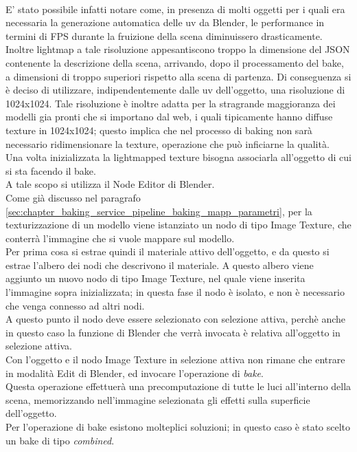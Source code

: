 \\ 
E’ stato possibile infatti notare come, in presenza di molti oggetti per i quali era necessaria la generazione automatica delle uv da Blender, le performance in termini di FPS durante la fruizione della scena diminuissero drasticamente. Inoltre lightmap a tale risoluzione appesantiscono troppo la dimensione del JSON contenente la descrizione della scena, arrivando, dopo il processamento del bake, a dimensioni di troppo superiori rispetto alla scena di partenza. Di conseguenza si è deciso di utilizzare, indipendentemente dalle uv dell’oggetto, una risoluzione di 1024x1024. Tale risoluzione è inoltre adatta per la stragrande maggioranza dei modelli gia pronti che si importano dal web, i quali tipicamente hanno diffuse texture in 1024x1024; questo implica che nel processo di baking non sarà necessario ridimensionare la texture, operazione che può inficiarne la qualità. 
\\
Una volta inizializzata la lightmapped texture bisogna associarla all’oggetto di cui si sta facendo il bake. 
\\
A tale scopo si utilizza il Node Editor di Blender. 
\\
Come già discusso nel paragrafo \ref{sec:chapter_baking_service_pipeline_baking_mapp_parametri}, per la texturizzazione di un modello viene istanziato un nodo di tipo Image Texture, che conterrà l’immagine che si vuole mappare sul modello.
\\ 
Per prima cosa si estrae quindi il materiale attivo dell’oggetto, e da questo si estrae l’albero dei nodi che descrivono il materiale. A questo albero viene aggiunto un nuovo nodo di tipo Image Texture, nel quale viene inserita l’immagine sopra inizializzata; in questa fase il nodo è isolato, e non è necessario che venga connesso ad altri nodi. 
\\
A questo punto il nodo deve essere selezionato con selezione attiva, perchè anche in questo caso la funzione di Blender che verrà invocata è relativa all’oggetto in selezione attiva.
\\ 
Con l’oggetto e il nodo Image Texture in selezione attiva non rimane che entrare in modalità Edit di Blender, ed invocare l’operazione di \emph{bake}. 
\\
Questa operazione effettuerà una precomputazione di tutte le luci all’interno della scena, memorizzando nell’immagine selezionata gli effetti sulla superficie dell’oggetto. 
\\
Per l’operazione di bake esistono molteplici soluzioni; in questo caso è stato scelto un bake di tipo \emph{combined}. 
